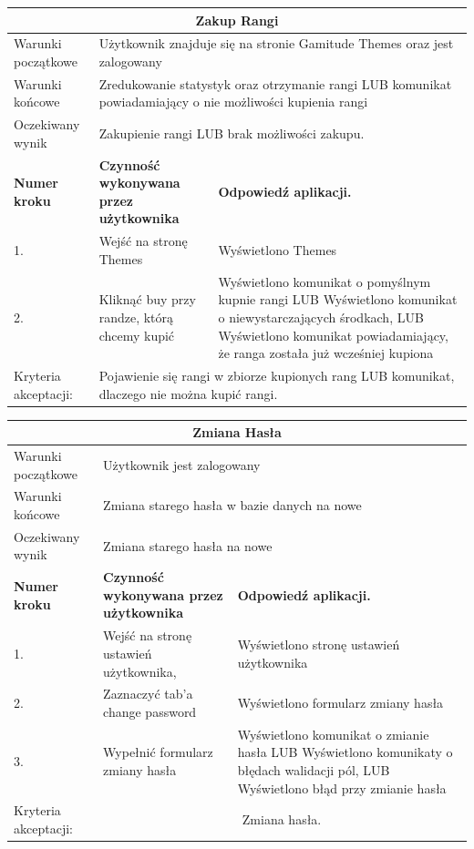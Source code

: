 \documentclass[a4paper,11pt]{report}
\begin{document}
\begin{table}[H]
	\centering
	\begin{tabular}{|p{2cm}|p{6cm}|p{6cm}|}
	\hline
	\multicolumn{3}{|c|}{\textbf{Zakup Rangi}}\\
	\hline
	Warunki początkowe & \multicolumn{2}{|p{12cm}|}{Użytkownik znajduje się na stronie Gamitude Themes oraz jest zalogowany}\\
	\hline
	Warunki końcowe & \multicolumn{2}{|p{12cm}|}{Zredukowanie statystyk oraz otrzymanie rangi LUB komunikat powiadamiający o nie możliwości kupienia rangi}\\
	\hline
	Oczekiwany wynik & \multicolumn{2}{|p{12cm}|}{Zakupienie rangi LUB brak możliwości zakupu.}\\
	\hline
	\textbf{Numer kroku} & \textbf{Czynność wykonywana przez użytkownika} & \textbf{Odpowiedź aplikacji.} \\
	\hline
	1. & Wejść na stronę Themes & Wyświetlono Themes \\
	\hline
	2. & Kliknąć buy przy randze, którą chcemy kupić & Wyświetlono komunikat o pomyślnym kupnie rangi
	LUB Wyświetlono komunikat o niewystarczających środkach,
	LUB Wyświetlono komunikat powiadamiający, że ranga została już wcześniej kupiona \\	
	\hline
	Kryteria akceptacji: & \multicolumn{2}{|p{12cm}|}{Pojawienie się rangi w zbiorze kupionych rang LUB komunikat, dlaczego nie można kupić rangi.} \\
	\hline
	\end{tabular}
\end{table}
\begin{table}[H]
	\centering
	\begin{tabular}{|p{2cm}|p{6cm}|p{6cm}|}
	\hline
	\multicolumn{3}{|c|}{\textbf{Zmiana Hasła}}\\
	\hline
	Warunki początkowe & \multicolumn{2}{|p{12cm}|}{Użytkownik jest zalogowany}\\
	\hline
	Warunki końcowe & \multicolumn{2}{|p{12cm}|}{Zmiana starego hasła w bazie danych na nowe}\\
	\hline
	Oczekiwany wynik & \multicolumn{2}{|p{12cm}|}{Zmiana starego hasła na nowe}\\
	\hline
	\textbf{Numer kroku} & \textbf{Czynność wykonywana przez użytkownika} & \textbf{Odpowiedź aplikacji.} \\
	\hline
	1. & Wejść na stronę ustawień użytkownika, & Wyświetlono stronę ustawień użytkownika \\
	\hline
	2. & Zaznaczyć tab'a change password & Wyświetlono formularz zmiany hasła \\
	\hline
	3. & Wypełnić formularz zmiany hasła & Wyświetlono komunikat o zmianie hasła
	LUB Wyświetlono komunikaty o błędach walidacji pól,
	LUB Wyświetlono błąd przy zmianie hasła \\	
	\hline
	Kryteria akceptacji: & \multicolumn{2}{|c|}{Zmiana hasła.} \\
	\hline
	\end{tabular}
\end{table}
\end{document}
